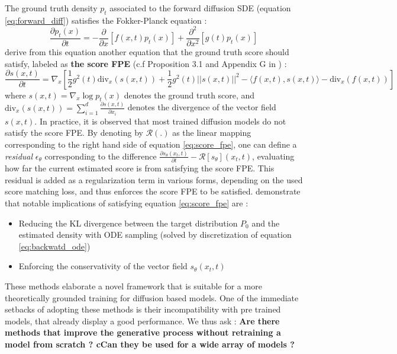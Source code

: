 The ground truth density $p_{t}$ associated to the forward diffusion SDE (equation \ref{eq:forward_diff}) satisfies the Fokker-Planck equation \citep{oksendal2003stochastic} : 
\begin{equation}\label{eq:fokker_plack}
  \frac{\partial p_t(x)}{\partial t} = -\frac{\partial}{\partial x} \left[ f(x, t) p_t(x) \right] + \frac{\partial^2}{\partial x^2} \left[g(t) p_t(x) \right]
\end{equation}
\citep{lai_fp-diffusion_2023} derive from this equation another equation that the ground truth score should satisfy, labeled as \textbf{the score FPE} (c.f Proposition 3.1 and Appendix G in \citep{lai_fp-diffusion_2023}) : 
\begin{equation}\label{eq:score_fpe}
    \frac{\partial s(x,t)}{\partial t} = \nabla_{x}\left[\frac{1}{2}g^{2}(t)\mathrm{div}_{x}(s(x,t)) + \frac{1}{2}g^{2}(t)\left|\left|s(x,t)\right|\right|^{2} - \langle f(x,t),s(x,t) \rangle - \mathrm{div}_{x}(f(x,t))\right]
\end{equation}
where $s(x,t) = \nabla_{x} \log p_{t}(x)$ denotes the ground truth score, and $\mathrm{div}_{x}(s(x,t))= \sum_{i=1}^{d}\frac{\partial s(x,t)}{\partial x_{i}} $ denotes the divergence of the vector field $s(x,t)$. In practice, it is observed that most trained diffusion models do not satisfy the score FPE. By denoting by $\mathcal{R}(.) $ as the linear mapping corresponding to the right hand side of equation \ref{eq:score_fpe}, one can define a \textit{residual} $\epsilon_{\theta}$ corresponding to the difference $\frac{\partial s_{\theta}(x_{t},t)}{\partial t} - \mathcal{R}[s_{\theta}](x_{t},t) $, evaluating how far the current estimated score is from satisfying the score FPE. This residual is added as a regularization term in various forms, depending on the used score matching loss, and thus enforces the score FPE to be satisfied.
\citep{lai_fp-diffusion_2023} demonstrate that notable implications of satisfying equation \ref{eq:score_fpe} are : 
\begin{itemize}
    \item Reducing the KL divergence between the target distribution $P_{0}$ and the estimated density with ODE sampling (solved by discretization of equation \ref{eq:backwatd_ode})
    \item Enforcing the conservativity of the vector field $s_{\theta}(x_{t},t)$
\end{itemize}
These methods elaborate a novel framework that is suitable for a more theoretically grounded training for diffusion based models. One of the immediate setbacks of adopting these methods is their incompatibility with pre trained models, that already display a good performance. We thus ask : \textbf{Are there methods that improve the generative process without retraining a model from scratch ? cCan they be used for a wide array of models ?}
